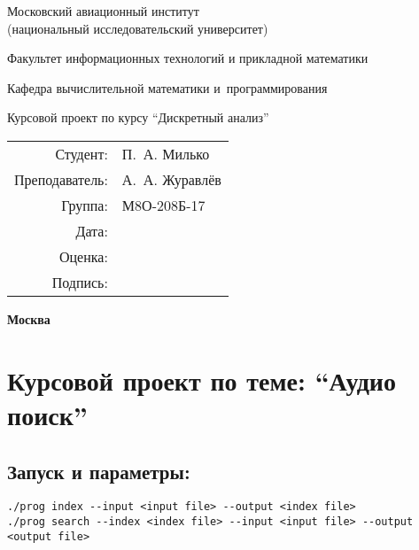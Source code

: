 \documentclass[12pt]{article}
\newcommand{\se}[1]{\section*{\bf #1}}
\begin{document}
\thispagestyle{empty}
\begin{center}
	\bfseries

	{\Large Московский авиационный институт\\ (национальный исследовательский университет)

	}

	\vspace{48pt}

	{\large Факультет информационных технологий и прикладной математики
	}

	\vspace{36pt}


	{\large Кафедра вычислительной математики и~программирования

	}


	\vspace{48pt}

	{Курсовой проект по курсу ``Дискретный анализ''}

\end{center}

\vspace{72pt}

\begin{flushright}
	\begin{tabular}{rl}
		Студент:       & П.\, А. Милько   \\
		Преподаватель: & А.\, А. Журавлёв \\
		Группа:        & М8О-208Б-17      \\
		Дата:          &                  \\
		Оценка:        &                  \\
		Подпись:       &                  \\
	\end{tabular}
\end{flushright}

\vfill

\begin{center}
	\bfseries
	Москва\\
	\the\year
\end{center}
\newpage
\setcounter{page}{1}

\se{Курсовой проект по теме: ``Аудио поиск''}

\subsection*{Запуск и параметры:}
\begin{lstlisting}[style=empty]
./prog index --input <input file> --output <index file>
./prog search --index <index file> --input <input file> --output <output file>
\end{lstlisting}
\end{document}

